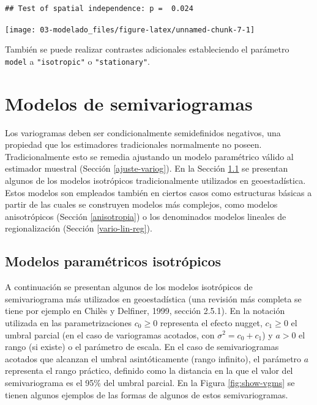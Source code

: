 \documentclass[
  spanish,
]{book}
\theoremstyle{break}
\theoremstyle{definition}
\theoremstyle{definition}
\theoremstyle{definition}
\theoremstyle{definition}
\theoremstyle{remark}
\begin{document}
\begin{verbatim}
## Test of spatial independence: p =  0.024
\end{verbatim}

\begin{center}\texttt{[image: 03-modelado\_files/figure-latex/unnamed-chunk-7-1]} \end{center}

También se puede realizar contrastes adicionales estableciendo el parámetro \texttt{model} a \texttt{"isotropic"} o \texttt{"stationary"}.

\hypertarget{modelos-variog}{%
\section{Modelos de semivariogramas}\label{modelos-variog}}

Los variogramas deben ser condicionalmente semidefinidos negativos, una propiedad que los estimadores tradicionales normalmente no poseen.
Tradicionalmente esto se remedia ajustando un modelo paramétrico válido al estimador muestral (Sección \ref{ajuste-variog}).
En la Sección \ref{modelos-parametricos} se presentan algunos de los modelos isotrópicos tradicionalmente utilizados en geoestadística.
Estos modelos son empleados también en ciertos casos como estructuras básicas a partir de las cuales se construyen modelos más complejos, como modelos anisotrópicos (Sección \ref{anisotropia}) o los denominados modelos lineales de regionalización (Sección \ref{vario-lin-reg}).

\hypertarget{modelos-parametricos}{%
\subsection{Modelos paramétricos isotrópicos}\label{modelos-parametricos}}

A continuación se presentan algunos de los modelos isotrópicos de semivariograma más utilizados en geoestadística (una revisión más completa se tiene por ejemplo en Chilès y Delfiner, 1999, sección 2.5.1).
En la notación utilizada en las parametrizaciones \(c_{0} \geq 0\) representa el efecto nugget, \(c_1 \geq 0\) el umbral parcial (en el caso de variogramas acotados, con \(\sigma^2= c_0 + c_1\)) y \(a>0\) el rango (si existe) o el parámetro de escala.
En el caso de semivariogramas acotados que alcanzan el umbral asintóticamente (rango infinito), el parámetro \(a\) representa el rango práctico, definido como la distancia en la que el valor del semivariograma es el 95\% del umbral parcial.
En la Figura \ref{fig:show-vgms} se tienen algunos ejemplos de las formas de algunos de
estos semivariogramas.
\end{document}
